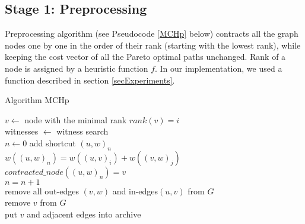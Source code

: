 

\subsection{Stage 1: Preprocessing} \label{subsecStage1}

Preprocessing algorithm (see Pseudocode \ref{MCHp} below) contracts all the
graph nodes one by one in the order of their rank (starting with the lowest
rank), while keeping the cost vector of all the Pareto optimal paths unchanged.
Rank of a node is assigned by a heuristic function $f$. In our implementation,
we used a function described in section \ref{secExperiments}.

\begin{algorithm}[H]
    \SetAlgoLined
    \LinesNumbered
    \caption{Algorithm MCHp}
    \label{MCHp}
     {
        $v \leftarrow $ node with the minimal rank
        $rank(v) = i$ \\
        witnesses $\leftarrow$ witness search \\
        $n \leftarrow 0$  
         {
             {
                add shortcut $(u,w)_n$ \\
                $w((u,w)_n) = w((u,v)_i)+w((v,w)_j)$ \\
                $contracted\_node((u,w)_n) = v$ \\
                $n = n+1$ \\
            }
        }
        remove all out-edges $(v,w)$ and in-edges$(u,v)$ from $G$ \\
        remove $v$ from $G$ \\
        put $v$ and adjacent edges into archive 
    }
\end{algorithm}

